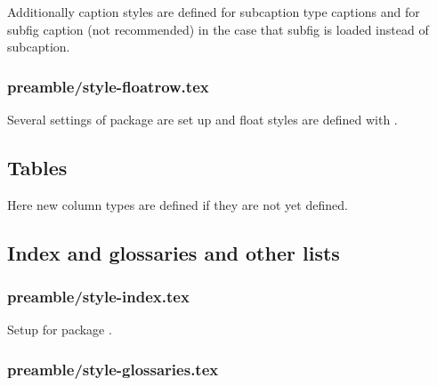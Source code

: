 Additionally caption styles are defined for subcaption type captions and for subfig caption (not recommended) in the case that subfig is loaded instead of subcaption.


\subsubsection{preamble/style-floatrow.tex}

Several settings of package  are set up and float styles are defined with .



\subsection{Tables}

Here new column types are defined if they are not yet defined.


\subsection{Index and glossaries and other lists}


\subsubsection{preamble/style-index.tex}

Setup for package .


\subsubsection{preamble/style-glossaries.tex}

